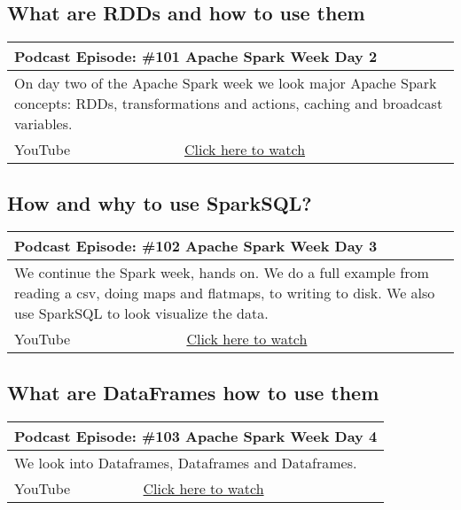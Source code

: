 \documentclass[12pt, numbers=noenddot]{scrreprt} %
\begin{document}
\subsection{What are RDDs and how to use them}

\begin{table}[h]
\begin{tabular}{ll}
\hline
\multicolumn{2}{l}{\textbf{Podcast Episode:} \#101 Apache Spark Week Day 2} \\ \hline
\multicolumn{2}{p{15cm}}{On day two of the Apache Spark week we look major Apache Spark concepts: RDDs, transformations and actions, caching and broadcast variables.}         \\ \hline
\multicolumn{1}{l|}{YouTube}   & \href{https://youtu.be/9I6mA2W6_HU}{Click here to watch}   \\ \hline
\end{tabular}
\end{table}

\subsection{How and why to use SparkSQL?}

\begin{table}[h]
\begin{tabular}{ll}
\hline
\multicolumn{2}{l}{\textbf{Podcast Episode:} \#102 Apache Spark Week Day 3} \\ \hline
\multicolumn{2}{p{15cm}}{We continue the Spark week, hands on. We do a full example from reading a csv, doing maps and flatmaps, to writing to disk. We also use SparkSQL to look visualize the data.}         \\ \hline
\multicolumn{1}{l|}{YouTube}   & \href{https://youtu.be/Fk-s8eKD4ZI}{Click here to watch}   \\ \hline
\end{tabular}
\end{table}

\subsection{What are DataFrames how to use them}

\begin{table}[h]
\begin{tabular}{ll}
\hline
\multicolumn{2}{l}{\textbf{Podcast Episode:} \#103 Apache Spark Week Day 4} \\ \hline
\multicolumn{2}{p{15cm}}{We look into Dataframes, Dataframes and Dataframes.}         \\ \hline
\multicolumn{1}{l|}{YouTube}   & \href{https://youtu.be/9I6mA2W6_HU}{Click here to watch}   \\ \hline
\end{tabular}
\end{table}
\end{document}

